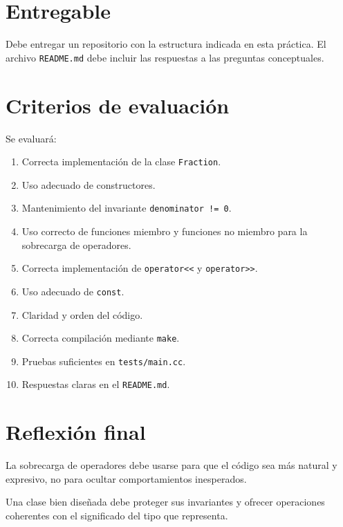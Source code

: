 \documentclass[11pt,a4paper]{article}
\begin{document}
\section{Entregable}

Debe entregar un repositorio con la estructura indicada en esta práctica. El archivo \lstinline|README.md| debe incluir las respuestas a las preguntas conceptuales.

\section{Criterios de evaluación}

Se evaluará:

\begin{enumerate}
  \item Correcta implementación de la clase \lstinline|Fraction|.
  \item Uso adecuado de constructores.
  \item Mantenimiento del invariante \lstinline|denominator != 0|.
  \item Uso correcto de funciones miembro y funciones no miembro para la sobrecarga de operadores.
  \item Correcta implementación de \lstinline|operator<<| y \lstinline|operator>>|.
  \item Uso adecuado de \lstinline|const|.
  \item Claridad y orden del código.
  \item Correcta compilación mediante \lstinline|make|.
  \item Pruebas suficientes en \lstinline|tests/main.cc|.
  \item Respuestas claras en el \lstinline|README.md|.
\end{enumerate}

\section{Reflexión final}

La sobrecarga de operadores debe usarse para que el código sea más natural y expresivo, no para ocultar comportamientos inesperados.

Una clase bien diseñada debe proteger sus invariantes y ofrecer operaciones coherentes con el significado del tipo que representa.
\end{document}
